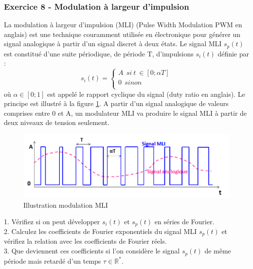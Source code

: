 	\subsubsection{Exercice 8 - Modulation à largeur d'impulsion}
	La modulation à largeur d'impulsion (MLI) (Pulse Width Modulation PWM en anglais) est une technique couramment utilisée en électronique pour générer un signal analogique à partir d'un signal discret à deux états. Le signal MLI $s_p(t)$ est constitué d'une suite périodique, de période T, d'impulsions $s_i(t)$ définie par :
	\begin{equation*}
	s_i(t)=\left \{
	\begin{array}{l}
	A~~si~t~\in[0;\alpha T] \\
	0~~sinon \\
	\end{array}
	\right .
	\end{equation*}   
	où $\alpha \in [0;1]$ est appelé le rapport cyclique du signal (duty ratio en anglais). Le principe est illustré à la figure \ref{Fig:signal_MLI}. A partir d'un signal analogique de valeurs comprises entre 0 et A, un modulateur MLI va produire le signal MLI à partir de deux niveaux de tension seulement.\\
	
	\begin{figure}[h!]
		\centering
		\includegraphics[scale=0.6]{images/signal_MLI.png}
		\caption{Illustration modulation MLI}	
		\label{Fig:signal_MLI} 
	\end{figure}
	
	1. Vérifiez si on peut développer $s_i(t)$ et $s_p(t)$ en séries de Fourier. \\
	
	2. Calculez les coefficients de Fourier exponentiels du signal MLI $s_p(t)$ et vérifiez la relation avec les coefficients de Fourier réels.\\
	
	3. Que deviennent ces coefficients si l'on considère le signal $s_p(t)$ de même période mais retardé d'un temps $\tau \in \mathbb{R^{*}}$.\\
	
